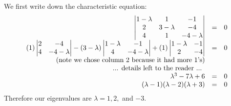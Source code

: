 We first write down the characteristic equation:
\[\begin{array}{rcl}
\left|\begin{matrix}1-\lambda&1&-1\\2&3-\lambda&-4\\4&1&-4-\lambda\end{matrix}\right| & = & 0\\
(1)\left|\begin{matrix}2&-4\\4&-4-\lambda\end{matrix}\right| - 
(3-\lambda)\left|\begin{matrix}1-\lambda&-1\\4&-4-\lambda\end{matrix}\right| + 
(1)\left|\begin{matrix}1-\lambda&-1\\2&-4\end{matrix}\right| & = & 0\\
\textnormal{(note we chose column 2 because it had more 1's)}\\
\textnormal{... details left to the reader ... }\\
\lambda^3 -7 \lambda + 6 & = & 0\\
(\lambda-1)(\lambda-2)(\lambda+3) & = & 0\\
\end{array}\]
Therefore our eigenvalues are $\lambda=1,2,$ and $-3$. 

